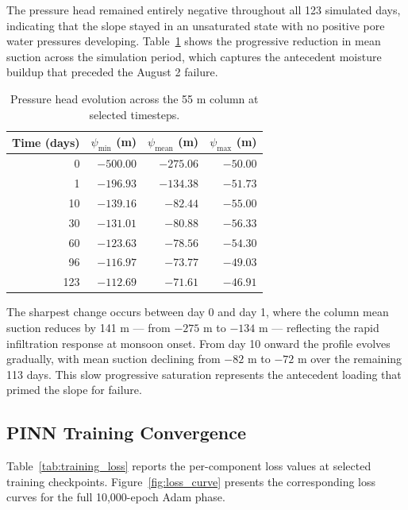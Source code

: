 \documentclass[12pt]{report}
\begin{document}
The pressure head remained entirely negative throughout all 123
simulated days, indicating that the slope stayed in an unsaturated
state with no positive pore water pressures developing.
Table~\ref{tab:psi_evolution} shows the progressive reduction in
mean suction across the simulation period, which captures the
antecedent moisture buildup that preceded the August 2 failure.

\begin{table}[htbp]
\centering
\begin{tabular}{rrrr}
\hline
\textbf{Time (days)} & \textbf{$\psi_{\min}$ (m)} &
\textbf{$\psi_{\text{mean}}$ (m)} & \textbf{$\psi_{\max}$ (m)} \\
\hline
0   & $-500.00$ & $-275.06$ & $-50.00$ \\
1   & $-196.93$ & $-134.38$ & $-51.73$ \\
10  & $-139.16$ & $-82.44$  & $-55.00$ \\
30  & $-131.01$ & $-80.88$  & $-56.33$ \\
60  & $-123.63$ & $-78.56$  & $-54.30$ \\
96  & $-116.97$ & $-73.77$  & $-49.03$ \\
123 & $-112.69$ & $-71.61$  & $-46.91$ \\
\hline
\end{tabular}
\caption{Pressure head evolution across the 55 m column at
selected timesteps.}
\label{tab:psi_evolution}
\end{table}

The sharpest change occurs between day 0 and day 1, where the column
mean suction reduces by 141 m — from $-275$ m to $-134$ m —
reflecting the rapid infiltration response at monsoon onset.
From day 10 onward the profile evolves gradually, with mean suction
declining from $-82$ m to $-72$ m over the remaining 113 days.
This slow progressive saturation represents the antecedent loading
that primed the slope for failure.

\subsection{PINN Training Convergence}

Table~\ref{tab:training_loss} reports the per-component loss values
at selected training checkpoints. Figure~\ref{fig:loss_curve} presents
the corresponding loss curves for the full 10,000-epoch Adam phase.
\end{document}
